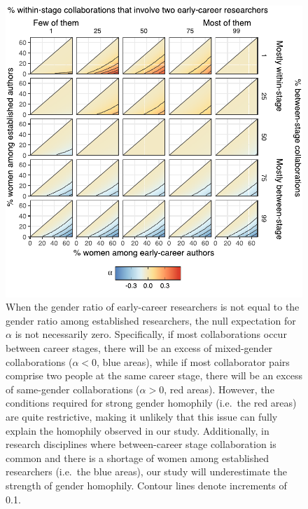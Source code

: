 \documentclass[12pt,]{article}
\begin{document}
\begin{figure}
\centering
\includegraphics{../figures/Fig6_inkscape.pdf}
\caption{When the gender ratio of early-career researchers is not equal
to the gender ratio among established researchers, the null expectation
for \(\alpha\) is not necessarily zero. Specifically, if most
collaborations occur between career stages, there will be an excess of
mixed-gender collaborations (\(\alpha < 0\), blue areas), while if most
collaborator pairs comprise two people at the same career stage, there
will be an excess of same-gender collaborations (\(\alpha > 0\), red
areas). However, the conditions required for strong gender homophily
(i.e.~the red areas) are quite restrictive, making it unlikely that this
issue can fully explain the homophily observed in our study.
Additionally, in research disciplines where between-career stage
collaboration is common and there is a shortage of women among
established researchers (i.e.~the blue areas), our study will
underestimate the strength of gender homophily. Contour lines denote
increments of 0.1. \label{simulation}}
\end{figure}
\end{document}

